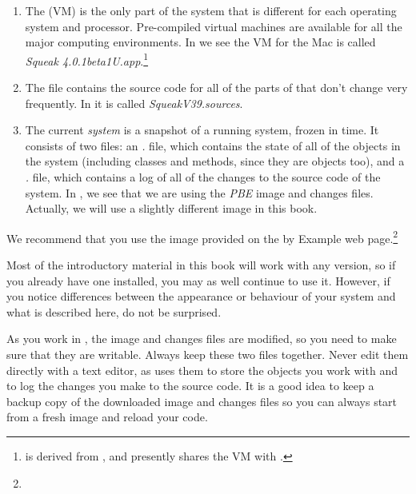 \documentclass[a4paper,10pt,twoside]{book}
\begin{document}
\begin{enumerate}

  \item The  (VM) is the only part of the system that is different for each operating system and processor.  Pre-compiled virtual machines are available for all the major computing environments.  In  we see the VM for the Mac is called \textit{Squeak 4.0.1beta1U.app}.\footnote{\pharo is derived from , and presently shares the VM with \squeak.}

  \item The  file contains the source code for all of the parts of \pharo that don't change very frequently. In  it is called \emph{SqueakV39.sources}.

  \item The current \emph{system } is a snapshot of a running \pharo system, frozen in time.  It consists of two files: an \emph{.} file, which contains the state of all of the objects in the system (including classes and methods, since they are objects too), and a \emph{.} file, which contains a log of all of the changes to the source code of the system.
In , we see that we are using the \textit{PBE} image and changes files.
Actually, we will use a slightly different image in this book. 
\end{enumerate}

We recommend that you use the image provided on the \pharo by Example web page.\footnote{\pbe}
\label{sec:sbeImage}

Most of the introductory material in this book will work with any version, so if you already have one installed, you may as well continue to use it.
However, if you notice differences between the appearance or behaviour of your system and what is described here, do not be surprised. 

As you work in \pharo, the image and changes files are modified, so you need to make sure that they are writable.
Always keep these two files together.
Never edit them directly with a text editor, as \pharo uses them to store the objects you work with and to log the changes you make to the source code.
It is a good idea to keep a backup copy of the downloaded image and changes files so you can always start from a fresh image and reload your code.
\end{document}
